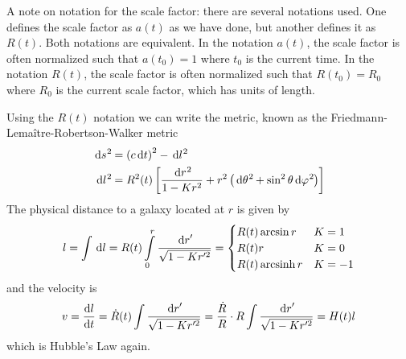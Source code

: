 A note on notation for the scale factor: there are several notations used. One defines the scale factor as \(a(t)\) as we have done, but another defines it as \(R(t)\). Both notations are equivalent. In the notation \(a(t)\), the scale factor is often normalized such that \(a(t_0)=1\) where \(t_0\) is the current time. In the notation \(R(t)\), the scale factor is often normalized such that \(R(t_0)=R_0\) where \(R_0\) is the current scale factor, which has units of length.

Using the \(R(t)\) notation we can write the metric, known as the Friedmann-Lemaître-Robertson-Walker metric
\begin{align}
    \dl s^2 &= \ins{c\dl t}^2 - \dl l^2 \\
    \dl l^2 &= R^2(t)\left[\frac{\dl r^2}{1-Kr^2}+r^2\ins{\dl \theta^2+\sin^2\theta\dl \phi^2}\right]
\end{align}
The physical distance to a galaxy located at \(r\) is given by
\begin{equation}
    l = \int \dl l = R(t)\int\limits_0^r \frac{\dl r'}{\sqrt{1-Kr'^2}} = \begin{cases}
        R(t) \arcsin r & K=1 \\
        R(t) r & K=0 \\
        R(t) \arcsinh r & K=-1
    \end{cases}
\end{equation}
and the velocity is
\begin{equation}
    v = \diff{l}{t} = \dot{R}(t) \int \frac{\dl r'}{\sqrt{1-Kr'^2}} = \frac{\dot{R}}{R} \cdot R\int \frac{\dl r'}{\sqrt{1-Kr'^2}} = H(t) l
\end{equation}
which is Hubble's Law again.
